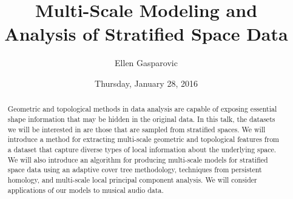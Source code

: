 \documentclass{UAmathtalk}
\author{Ellen Gasparovic}
\title{Multi-Scale Modeling and\\ Analysis of Stratified Space Data}
\date{Thursday, January 28, 2016}
\begin{document}
\maketitle

\begin{abstract}
Geometric and topological methods in data analysis are capable of exposing essential shape information that may be hidden in the original data. In this talk, the datasets we will be interested in are those that are sampled from stratified spaces. We will introduce a method for extracting multi-scale geometric and topological features from a dataset that capture diverse types of local information about the underlying space. We will also introduce an algorithm for producing multi-scale models for stratified space data using an adaptive cover tree methodology, techniques from persistent homology, and multi-scale local principal component analysis. We will consider applications of our models to musical audio data.
\end{abstract}
\end{document}
